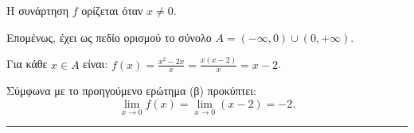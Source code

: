 \begin{alist}
\item Η συνάρτηση $f$ ορίζεται όταν $x \neq 0$.

Επομένως, έχει ως πεδίο ορισμού το σύνολο $A = (-\infty, 0) \cup (0, +\infty)$.

\item Για κάθε $x \in A$ είναι: $f(x) = \frac{x^2 - 2x}{x} = \frac{x(x - 2)}{x} = x - 2$.

\item Σύμφωνα με το προηγούμενο ερώτημα (β) προκύπτει:
\[ \lim\limits_{x \to 0}f(x) = \lim\limits_{x \to 0}(x - 2) = -2. \]
\end{alist}
\vspace{6mm}
\noindent\rule{\textwidth}{0.4pt}
\vspace{6mm}

